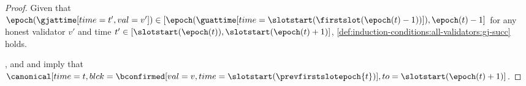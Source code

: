 \documentclass{article}
\begin{document}
\begin{proof}
    Given that $\epoch(\gjattime[time=t',val=v']) \in [\epoch(\guattime[time=\slotstart(\firstslot(\epoch(t)-1))]),\epoch(t)-1]$ for any honest validator $v'$ and time $t' \in [\slotstart(\epoch(t)),\slotstart(\epoch(t)+1)]$, \ref{def:induction-conditions:all-validators:gj-succ} holds.














    \sirone, \sirtwo and \sirthree and  imply that $\canonical[time=t,blck={\bconfirmed[val=v,time=\slotstart(\prevfirstslotepoch{t})]},to=\slotstart(\epoch(t)+1)]$. 


\end{proof}
\end{document}

